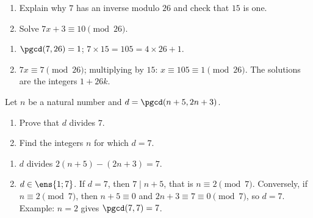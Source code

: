 \begin{exercise}
\begin{enumerate}
\item Explain why $7$ has an inverse modulo $26$ and check that $15$ is one.
\item Solve $7x+3\equiv10\pmod{26}$.
\end{enumerate}
\end{exercise}
\begin{solution}
\begin{enumerate}
\item $\pgcd(7,26)=1$; $7\times15=105=4\times26+1$.
\item $7x\equiv7\pmod{26}$; multiplying by $15$: $x\equiv105\equiv1\pmod{26}$. The solutions are the integers $1+26k$.
\end{enumerate}
\end{solution}

\begin{exercise}
Let $n$ be a natural number and $d=\pgcd(n+5,2n+3)$.
\begin{enumerate}
\item Prove that $d$ divides $7$.
\item Find the integers $n$ for which $d=7$.
\end{enumerate}
\end{exercise}
\begin{solution}
\begin{enumerate}
\item $d$ divides $2(n+5)-(2n+3)=7$.
\item $d\in\ens{1;7}$. If $d=7$, then $7\mid n+5$, that is $n\equiv2\pmod7$. Conversely, if $n\equiv2\pmod7$, then $n+5\equiv0$ and $2n+3\equiv7\equiv0\pmod7$, so $d=7$. Example: $n=2$ gives $\pgcd(7,7)=7$.
\end{enumerate}
\end{solution}

\mxnewpage
